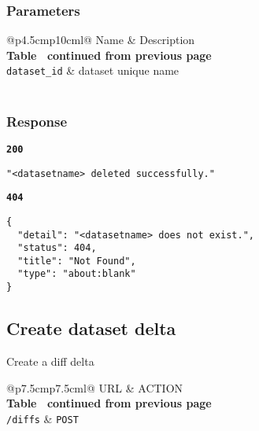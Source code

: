 \subsubsection{Parameters}
\begin{longtable}[c]{@{}p{4.5cm}p{10cm}l@{}}
  \toprule
  Name                 & Description                          \\* \midrule
  \endfirsthead
  \multicolumn{3}{c}%
  {{\bfseries Table \thetable\ continued from previous page}} \\
  \endhead
  \bottomrule
  \endfoot
  \endlastfoot
  \texttt{dataset\_id} & dataset unique name                  \\* \bottomrule
  \label{tab:rdf-differ-get-diff-parameters}                  \\
\end{longtable}

\subsubsection{Response}
\textbf{\texttt{200}}
\begin{lstlisting}
"<datasetname> deleted successfully."
\end{lstlisting}

\textbf{\texttt{404}}
\begin{lstlisting}
{
  "detail": "<datasetname> does not exist.",
  "status": 404,
  "title": "Not Found",
  "type": "about:blank"
}
\end{lstlisting}

\subsection{Create dataset delta}
Create a diff delta

\begin{longtable}[c]{@{}p{7.5cm}p{7.5cm}l@{}}
  \toprule
  URL             & ACTION                                    \\* \midrule
  \endfirsthead
  \multicolumn{3}{c}%
  {{\bfseries Table \thetable\ continued from previous page}} \\
  \endhead
  \bottomrule
  \endfoot
  \endlastfoot
  \texttt{/diffs} & \texttt{POST}                             \\* \bottomrule
  \label{tab:rdf-differ-create-diffs}                         \\
\end{longtable}

